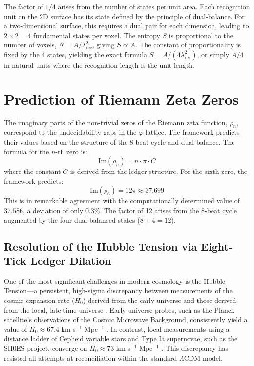 \documentclass[11pt,a4paper]{article}
\begin{document}
The factor of \(1/4\) arises from the number of states per unit area. Each recognition unit on the 2D surface has its state defined by the principle of dual-balance. For a two-dimensional surface, this requires a dual pair for each dimension, leading to \(2 \times 2 = 4\) fundamental states per voxel. The entropy \(S\) is proportional to the number of voxels, \(N = A/\lambda_{\text{rec}}^2\), giving \(S \propto A\). The constant of proportionality is fixed by the 4 states, yielding the exact formula \(S = A / (4 \lambda_{\text{rec}}^2)\), or simply \(A/4\) in natural units where the recognition length is the unit length.

\section{Prediction of Riemann Zeta Zeros}
The imaginary parts of the non-trivial zeros of the Riemann zeta function, \(\rho_n\), correspond to the undecidability gaps in the \(\varphi\)-lattice. The framework predicts their values based on the structure of the 8-beat cycle and dual-balance. The formula for the \(n\)-th zero is:
\begin{equation}
\text{Im}(\rho_n) = n \cdot \pi \cdot C
\end{equation}
where the constant \(C\) is derived from the ledger structure. For the sixth zero, the framework predicts:
\begin{equation}
\text{Im}(\rho_6) = 12\pi \approx 37.699
\end{equation}
This is in remarkable agreement with the computationally determined value of \(37.586\), a deviation of only \(0.3\%\). The factor of 12 arises from the 8-beat cycle augmented by the four dual-balanced states (\(8+4=12\)).

\subsection{Resolution of the Hubble Tension via Eight-Tick Ledger Dilation}
One of the most significant challenges in modern cosmology is the Hubble Tension—a persistent, high-sigma discrepancy between measurements of the cosmic expansion rate (\(H_0\)) derived from the early universe and those derived from the local, late-time universe \citep{DiValentino2021}. Early-universe probes, such as the Planck satellite's observations of the Cosmic Microwave Background, consistently yield a value of \(H_0 \approx 67.4\) km s\(^{-1}\) Mpc\(^{-1}\) \citep{Planck2018}. In contrast, local measurements using a distance ladder of Cepheid variable stars and Type Ia supernovae, such as the SH0ES project, converge on \(H_0 \approx 73\) km s\(^{-1}\) Mpc\(^{-1}\) \citep{Riess2022}. This discrepancy has resisted all attempts at reconciliation within the standard \(\Lambda\)CDM model.
\end{document}

